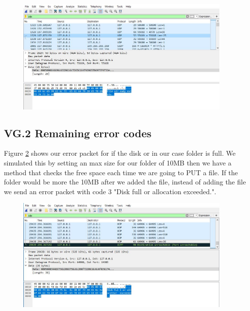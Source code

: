\documentclass[a4paper,12pt]{article}
\numberwithin{figure}{section}
\begin{document}
\begin{figure}[h!]
	\centering
	\includegraphics[width=0.95\textwidth,keepaspectratio]{img/error6.jpg} 
	\caption{}
	\label{error 6}
\end{figure}

\newpage

\subsection{VG.2 Remaining error codes}

\noindent Figure \ref{error 3} shows our error packet for if the disk or in our case folder is full. We simulated this by setting an max size for our folder of 10MB then we have a method that checks the free space each time we are going to PUT a file. If the folder would be more the 10MB after we added the file, instead of adding the file we send an error packet with code 3 "Disk full or allocation exceeded."\cite{RFC1350}.

\begin{figure}[h!]
	\centering
	\includegraphics[width=0.95\textwidth,keepaspectratio]{img/error3.jpg} 
	\caption{}
	\label{error 3}
\end{figure}
\end{document}
